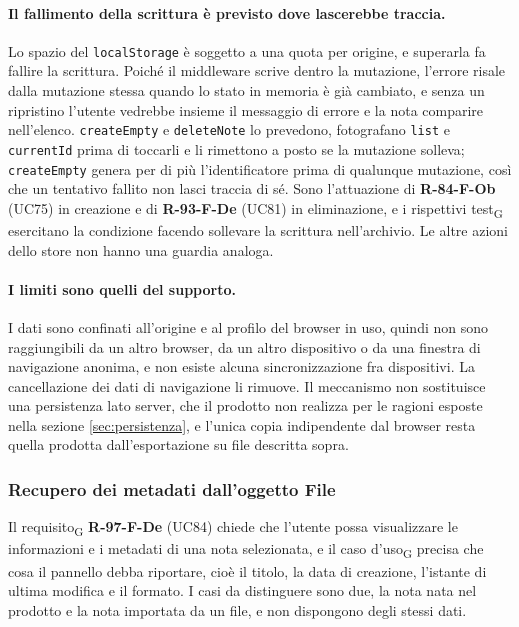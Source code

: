 \documentclass[a4paper, 10pt]{article}
\begin{document}
\paragraph{Il fallimento della scrittura è previsto dove lascerebbe traccia.}
Lo spazio del \texttt{localStorage} è soggetto a una quota per origine, e superarla fa fallire la scrittura. Poiché il middleware scrive dentro la mutazione, l'errore risale dalla mutazione stessa quando lo stato in memoria è già cambiato, e senza un ripristino l'utente vedrebbe insieme il messaggio di errore e la nota comparire nell'elenco. \texttt{createEmpty} e \texttt{deleteNote} lo prevedono, fotografano \texttt{list} e \texttt{currentId} prima di toccarli e li rimettono a posto se la mutazione solleva; \texttt{createEmpty} genera per di più l'identificatore prima di qualunque mutazione, così che un tentativo fallito non lasci traccia di sé. Sono l'attuazione di \textbf{R-84-F-Ob} (UC75) in creazione e di \textbf{R-93-F-De} (UC81) in eliminazione, e i rispettivi test\textsubscript{G} esercitano la condizione facendo sollevare la scrittura nell'archivio. Le altre azioni dello store non hanno una guardia analoga.

\paragraph{I limiti sono quelli del supporto.}
I dati sono confinati all'origine e al profilo del browser in uso, quindi non sono raggiungibili da un altro browser, da un altro dispositivo o da una finestra di navigazione anonima, e non esiste alcuna sincronizzazione fra dispositivi. La cancellazione dei dati di navigazione li rimuove. Il meccanismo non sostituisce una persistenza lato server, che il prodotto non realizza per le ragioni esposte nella sezione \ref{sec:persistenza}, e l'unica copia indipendente dal browser resta quella prodotta dall'esportazione su file descritta sopra.

\subsubsection{Recupero dei metadati dall'oggetto File}
\label{sec:recupero-metadati}

Il requisito\textsubscript{G} \textbf{R-97-F-De} (UC84) chiede che l'utente possa visualizzare le informazioni e i metadati di una nota selezionata, e il caso d'uso\textsubscript{G} precisa che cosa il pannello debba riportare, cioè il titolo, la data di creazione, l'istante di ultima modifica e il formato. I casi da distinguere sono due, la nota nata nel prodotto e la nota importata da un file, e non dispongono degli stessi dati.
\end{document}

